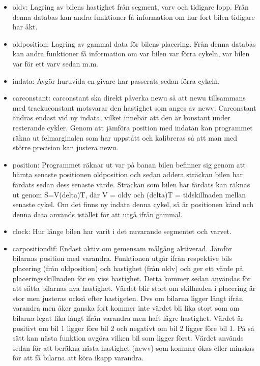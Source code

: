     \begin{itemize}
	\item old\textunderscore v: Lagring av bilens hastighet från segment, varv och tidigare lopp. Från denna databas kan andra funktioner få information om hur fort bilen tidigare har åkt. 	\item old\textunderscore position: Lagring av gammal data för bilens placering. Från denna databas kan andra funktioner få information om var bilen var förra cykeln, var bilen var för ett varv sedan m.m.
      \item indata: Avgör huruvida en givare har passerats sedan förra cykeln.

      \item car\textunderscore constant: car\textunderscore constant ska direkt påverka new\textunderscore u så att new\textunderscore u tillsammans med track\textunderscore u\textunderscore constant motsvarar den hastighet som anges av new\textunderscore v. Car\textunderscore constant ändras endast vid ny indata, vilket innebär att den är konstant under resterande cykler. Genom att jämföra position med indatan kan programmet räkna ut felmarginalen som har uppstått och kalibreras så att man med större precision kan justera new\textunderscore u.
 
      \item position: Programmet räknar ut var på banan bilen befinner sig genom att hämta senaste positionen old\textunderscore position och sedan addera sträckan bilen har färdats sedan dess senaste värde. Sträckan som bilen har färdats kan räknas ut genom S=V\textasteriskcentered (delta)T, där V = old\textunderscore v och (delta)T = tidskillnaden mellan senaste cykel. Om det finns ny indata denna cykel, så är positionen känd och denna data används istället för att utgå ifrån gammal.
      \item clock: Hur länge bilen har varit i det nuvarande segmentet och varvet.

      \item car\textunderscore position\textunderscore dif: Endast aktiv om gemensam målgång aktiverad. Jämför bilarnas position med varandra. Funktionen utgår ifrån respektive bils placering (från old\textunderscore position) och hastighet (från old\textunderscore v) 
och ger ett värde på placeringsskillnaden för en viss hastighet. Detta kommer
sedan användas för att sätta bilarnas nya hastighet. Värdet blir stort om skillnaden i placering är stor men justeras också efter hastigeten. Dvs om bilarna ligger långt ifrån varandra men åker ganska fort kommer inte värdet bli lika stort som om bilarna legat lika långt ifrån varandra men haft lägre hastighet. Värdet är positivt om bil 1 ligger före bil 2 och negativt om bil 2 ligger före bil 1. På så sätt kan nästa funktion avgöra vilken bil som ligger först.
Värdet används sedan för att beräkna nästa hastighet (new\textunderscore v) som kommer ökas eller minskas för att få bilarna att köra ikapp varandra. 


\end{itemize}
